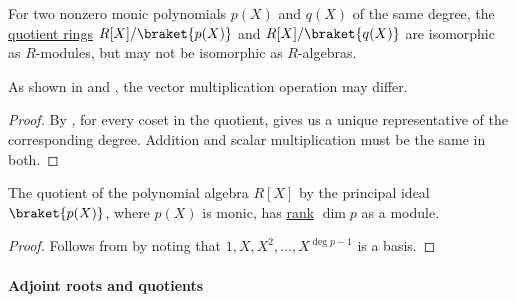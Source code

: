 \begin{corollary}\label{thm:polynomial_quotient_modules_vs_algebras}
  For two nonzero monic polynomials \( p(X) \) and \( q(X) \) of the same degree, the \hyperref[def:ring/quotient]{quotient rings} \( R[X] / \braket{ p(X) } \) and \( R[X] / \braket{ q(X) } \) are isomorphic as \( R \)-modules, but may not be isomorphic as \( R \)-algebras.
\end{corollary}
\begin{comments}
  \item As shown in  and , the vector multiplication operation may differ.
\end{comments}
\begin{proof}
  By , for every coset in the quotient,  gives us a unique representative of the corresponding degree. Addition and scalar multiplication must be the same in both.
\end{proof}

\begin{corollary}\label{thm:polynomial_quotient_module_dimension}
  The quotient of the polynomial algebra \( R[X] \) by the principal ideal \( \braket{ p(X) } \), where \( p(X) \) is monic, has \hyperref[thm:commutative_module_rank]{rank} \( \dim p \) as a module.
\end{corollary}
\begin{proof}
  Follows from  by noting that \( 1, X, X^2, \ldots, X^{\deg p-1} \) is a basis.
\end{proof}

\paragraph{Adjoint roots and quotients}

